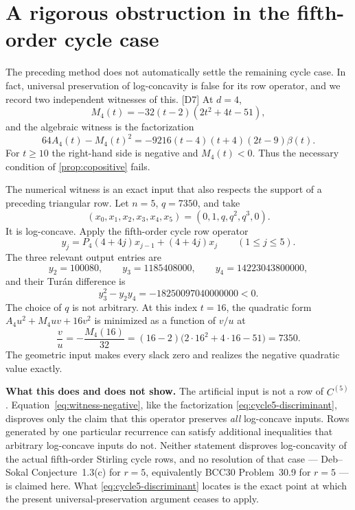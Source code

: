 \documentclass[11pt,a4paper]{article}
\numberwithin{equation}{section}
\theoremstyle{definition}
\theoremstyle{remark}
\newcommand{\Turan}{Tur\'an}
\newcommand{\dup}[1]{{\small\textsf{\color{MutedInk}[#1]}}}
\begin{document}
\section{A rigorous obstruction in the fifth-order cycle case}\label{sec:obstruction}

The preceding method does not automatically settle the remaining cycle
case. In fact, universal preservation of log-concavity is false for its
row operator, and we record two independent witnesses of this. \dup{D7}
At $d=4$,
\begin{equation}\label{eq:M4}
 M_4(t)=-32(t-2)(2t^2+4t-51),
\end{equation}
and the algebraic witness is the factorization
\begin{equation}\label{eq:cycle5-discriminant}
 \boxed{64A_4(t)-M_4(t)^2
       =-9216(t-4)(t+4)(2t-9)\beta(t).}
\end{equation}
For $t\ge10$ the right-hand side is negative and $M_4(t)<0$.
Thus the necessary condition of \cref{prop:copositive} fails.

The numerical witness is an exact input that also respects the support of a
preceding triangular row. Let $n=5$, $q=7350$, and take
\[
 (x_0,x_1,x_2,x_3,x_4,x_5)=(0,1,q,q^2,q^3,0).
\]
It is log-concave. Apply the fifth-order cycle row operator
\[
 y_j=P_4(4+4j)x_{j-1}+(4+4j)x_j\qquad(1\le j\le5).
\]
The three relevant output entries are
\begin{equation}\label{eq:witness-values}
 y_2=100080,\qquad y_3=1185408000,\qquad y_4=14223043800000,
\end{equation}
and their \Turan{} difference is
\begin{equation}\label{eq:witness-negative}
 y_3^2-y_2y_4=-18250097040000000<0.
\end{equation}
The choice of $q$ is not arbitrary. At this index $t=16$, the quadratic
form $A_4u^2+M_4uv+16v^2$ is minimized as a function of $v/u$ at
\[
 \frac vu=-\frac{M_4(16)}{32}
       =(16-2)\bigl(2\cdot16^2+4\cdot16-51\bigr)=7350.
\]
The geometric input makes every slack zero and realizes the negative
quadratic value exactly.

\begin{tcolorbox}
\textbf{What this does and does not show.}
The artificial input is not a row of $C^{(5)}$.
Equation~\eqref{eq:witness-negative}, like the factorization
\eqref{eq:cycle5-discriminant}, disproves only the claim that this
operator preserves \emph{all} log-concave inputs. Rows generated by one
particular recurrence can satisfy additional inequalities that arbitrary
log-concave inputs do not. Neither statement disproves log-concavity of the
actual fifth-order Stirling cycle rows, and no resolution of that case ---
Deb--Sokal Conjecture~1.3(c) for $r=5$, equivalently BCC30 Problem~30.9
for $r=5$ --- is claimed here. What \eqref{eq:cycle5-discriminant} locates
is the exact point at which the present universal-preservation argument
ceases to apply.
\end{tcolorbox}
\end{document}
